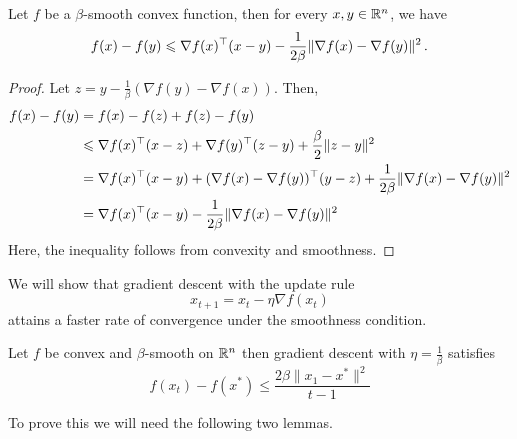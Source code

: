 \begin{lemma} 
Let $f$ be a $\beta$-smooth convex function, then for every $x,y \in \mathbb{R}^n$, we have
$$f(x) - f(y)\leqslant \nabla f(x)^\top(x-y) - 
\frac{1}{2\beta}\|\nabla f(x) - \nabla f(y)\|^2\,.$$
\end{lemma}

\begin{proof}
Let $z = y - \frac{1}{\beta}(\nabla f(y) - \nabla f(x))$.  Then,
\begin{align*}
f(x) - f(y)
    &= f(x) - f(z) + f(z) - f(y) \\
    &\leqslant \nabla f(x)^\top(x-z) + \nabla f(y)^\top(z-y) + \frac{\beta}{2}\|z-y\|^2 \\
    &= \nabla f(x)^\top(x-y) + (\nabla f(x) - \nabla f(y))^\top(y-z) + \frac{1}{2\beta}\|\nabla f(x) - \nabla f(y)\|^2 \\
    &= \nabla f(x)^\top(x-y) - \frac{1}{2\beta} \|\nabla f(x) - \nabla f(y)\|^2
\end{align*}
Here, the inequality follows from convexity and smoothness.
\end{proof}


We will show that gradient descent with the update rule
$$x_{t+1} = x_t - \eta \nabla f(x_t)$$
attains a faster rate of convergence under the smoothness condition.

\begin{theorem}
Let $f$ be convex and $\beta$-smooth on $\mathbb{R}^n$ then gradient descent with $\eta = \frac{1}{\beta}$ satisfies
$$f(x_t) - f(x^*) \leq \frac{2\beta\|x_1 - x^*\|^2}{t-1}$$
\end{theorem}
To prove this we will need the following two lemmas.


